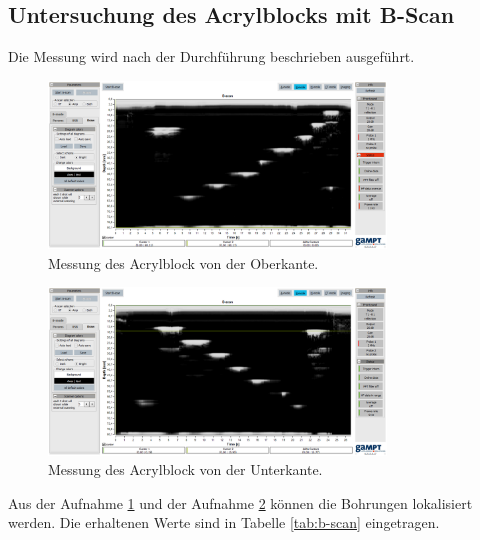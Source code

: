 \subsection{Untersuchung des Acrylblocks mit B-Scan}
Die Messung wird nach der Durchführung beschrieben ausgeführt.
\begin{figure}[H]
  \centering
  \includegraphics[width=0.8\textwidth]{content/bscan-2mhz_oberseite.png}
  \caption{Messung des Acrylblock von der Oberkante.}
  \label{fig:obs}
\end{figure}
\begin{figure}[H]
  \centering
  \includegraphics[width=0.8\textwidth]{content/bscan-2mhz_unterseite.png}
  \caption{Messung des Acrylblock von der Unterkante.}
  \label{fig:unts}
\end{figure}
Aus der Aufnahme \ref{fig:obs} und der Aufnahme \ref{fig:unts} können die Bohrungen lokalisiert werden.
Die erhaltenen Werte sind in Tabelle \ref{tab:b-scan} eingetragen.
